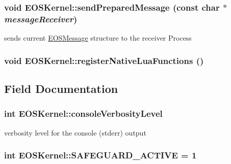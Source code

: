 \hypertarget{structEOSKernel_f515d2bca73d1c3eed643605274bc3c2}{
\subsubsection[{sendPreparedMessage}]{\setlength{\rightskip}{0pt plus 5cm}void EOSKernel::sendPreparedMessage (const char $\ast$ {\em messageReceiver})}}
\label{structEOSKernel_f515d2bca73d1c3eed643605274bc3c2}


sends current \hyperlink{classEOSMessage}{EOSMessage} structure to the receiver Process 

\hypertarget{structEOSKernel_9d3dac36c51293a2d55b5ccd55411fe1}{
\subsubsection[{registerNativeLuaFunctions}]{\setlength{\rightskip}{0pt plus 5cm}void EOSKernel::registerNativeLuaFunctions ()}}
\label{structEOSKernel_9d3dac36c51293a2d55b5ccd55411fe1}




\subsection{Field Documentation}
\hypertarget{structEOSKernel_834ee3631c926c273cb99ab2a80e2a4c}{
\subsubsection[{consoleVerbosityLevel}]{\setlength{\rightskip}{0pt plus 5cm}int {\bf EOSKernel::consoleVerbosityLevel}}}
\label{structEOSKernel_834ee3631c926c273cb99ab2a80e2a4c}


verbosity level for the console (stderr) output 

\hypertarget{structEOSKernel_c952db283e29f0b6927b130da6396d20}{
\subsubsection[{SAFEGUARD\_\-ACTIVE}]{\setlength{\rightskip}{0pt plus 5cm}int {\bf EOSKernel::SAFEGUARD\_\-ACTIVE} = 1}}
\label{structEOSKernel_c952db283e29f0b6927b130da6396d20}


